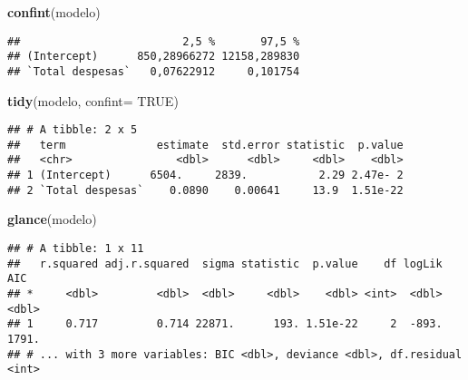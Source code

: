 \documentclass[]{article}
\newenvironment{Shaded}{\begin{snugshade}}{\end{snugshade}}
\newcommand{\KeywordTok}[1]{\textcolor[rgb]{0.13,0.29,0.53}{\textbf{#1}}}
\newcommand{\DataTypeTok}[1]{\textcolor[rgb]{0.13,0.29,0.53}{#1}}
\newcommand{\DecValTok}[1]{\textcolor[rgb]{0.00,0.00,0.81}{#1}}
\newcommand{\FloatTok}[1]{\textcolor[rgb]{0.00,0.00,0.81}{#1}}
\newcommand{\StringTok}[1]{\textcolor[rgb]{0.31,0.60,0.02}{#1}}
\newcommand{\OtherTok}[1]{\textcolor[rgb]{0.56,0.35,0.01}{#1}}
\newcommand{\OperatorTok}[1]{\textcolor[rgb]{0.81,0.36,0.00}{\textbf{#1}}}
\newcommand{\NormalTok}[1]{#1}
\begin{document}
\begin{Shaded}
\begin{Highlighting}[]
  \KeywordTok{confint}\NormalTok{(modelo)}
\end{Highlighting}
\end{Shaded}

\begin{verbatim}
##                         2,5 %       97,5 %
## (Intercept)      850,28966272 12158,289830
## `Total despesas`   0,07622912     0,101754
\end{verbatim}

\begin{Shaded}
\begin{Highlighting}[]
  \KeywordTok{tidy}\NormalTok{(modelo, }\DataTypeTok{confint=} \OtherTok{TRUE}\NormalTok{)}
\end{Highlighting}
\end{Shaded}

\begin{verbatim}
## # A tibble: 2 x 5
##   term              estimate  std.error statistic  p.value
##   <chr>                <dbl>      <dbl>     <dbl>    <dbl>
## 1 (Intercept)      6504.     2839.           2.29 2.47e- 2
## 2 `Total despesas`    0.0890    0.00641     13.9  1.51e-22
\end{verbatim}

\begin{Shaded}
\begin{Highlighting}[]
  \KeywordTok{glance}\NormalTok{(modelo)}
\end{Highlighting}
\end{Shaded}

\begin{verbatim}
## # A tibble: 1 x 11
##   r.squared adj.r.squared  sigma statistic  p.value    df logLik   AIC
## *     <dbl>         <dbl>  <dbl>     <dbl>    <dbl> <int>  <dbl> <dbl>
## 1     0.717         0.714 22871.      193. 1.51e-22     2  -893. 1791.
## # ... with 3 more variables: BIC <dbl>, deviance <dbl>, df.residual <int>
\end{verbatim}

\begin{Shaded}
\end{Shaded}
\end{document}
